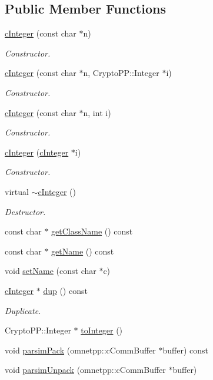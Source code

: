 \subsection*{Public Member Functions}
\begin{DoxyCompactItemize}
\item 
\hyperlink{classcInteger_afc876143cbe434def0b5851a98bc3ae8}{c\+Integer} (const char $\ast$n)
\begin{DoxyCompactList}\small\item\em Constructor. \end{DoxyCompactList}\item 
\hyperlink{classcInteger_a31669ca6b9b7f41f906320aaee8c8082}{c\+Integer} (const char $\ast$n, Crypto\+P\+P\+::\+Integer $\ast$i)
\begin{DoxyCompactList}\small\item\em Constructor. \end{DoxyCompactList}\item 
\hyperlink{classcInteger_aca26b0880fd20e8a87dbb435f29af348}{c\+Integer} (const char $\ast$n, int i)
\begin{DoxyCompactList}\small\item\em Constructor. \end{DoxyCompactList}\item 
\hyperlink{classcInteger_ad47b8fb0711aefe0d10fa8903d8ed6ca}{c\+Integer} (\hyperlink{classcInteger}{c\+Integer} $\ast$i)
\begin{DoxyCompactList}\small\item\em Constructor. \end{DoxyCompactList}\item 
virtual \hyperlink{classcInteger_a1e180c1db8ea39ad751a67e368a72465}{$\sim$c\+Integer} ()
\begin{DoxyCompactList}\small\item\em Destructor. \end{DoxyCompactList}\item 
const char $\ast$ \hyperlink{classcInteger_afd31eb924e2bfcc90f4a436acd4a827d}{get\+Class\+Name} () const
\item 
const char $\ast$ \hyperlink{classcInteger_ae6bb8246d4f19d41db22ffef801afd7c}{get\+Name} () const
\item 
void \hyperlink{classcInteger_aba2e5e7f13408b2dbbaf4a8460affc3c}{set\+Name} (const char $\ast$c)
\item 
\hyperlink{classcInteger}{c\+Integer} $\ast$ \hyperlink{classcInteger_a5fb5092056503a1241fbde5d80ef21ff}{dup} () const
\begin{DoxyCompactList}\small\item\em Duplicate. \end{DoxyCompactList}\item 
Crypto\+P\+P\+::\+Integer $\ast$ \hyperlink{classcInteger_a902f278d935322e8cce372ad4c465393}{to\+Integer} ()
\item 
void \hyperlink{classcInteger_a79060a0e5c29e71e7ba0b8b2d509109a}{parsim\+Pack} (omnetpp\+::c\+Comm\+Buffer $\ast$buffer) const
\item 
void \hyperlink{classcInteger_a0ae9eac774b0a394737209727486f93f}{parsim\+Unpack} (omnetpp\+::c\+Comm\+Buffer $\ast$buffer)
\end{DoxyCompactItemize}


